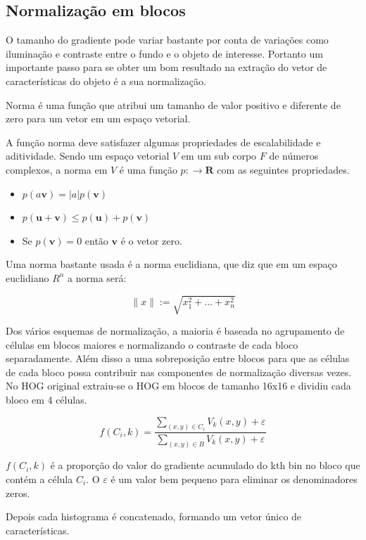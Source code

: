 \subsection{Normalização em blocos}

O tamanho do gradiente pode variar bastante por conta de variações como iluminação e contraste entre o fundo e o objeto de interesse. Portanto um importante passo para se obter um bom resultado na extração do vetor de características do objeto é a sua normalização.

Norma é uma função que atribui um tamanho de valor positivo e diferente de zero para um vetor em um espaço vetorial.

A função norma deve satisfazer algumas propriedades de escalabilidade e aditividade.
Sendo um espaço vetorial \(V\) em um sub corpo \(F\) de números complexos, a norma em \(V\) é uma função \(p:\rightarrow \mathbf{R}\) com as seguintes propriedades.

\begin{itemize}
\item \( p(a\mathbf{v}) = |a|p(\mathbf{v}) \)
\item \( p(\mathbf{u + v}) \leq p(\mathbf{u}) + p(\mathbf{v}) \)
\item Se \( p(\mathbf{v}) = 0 \) então \(\mathbf{v}\) é o vetor zero.
\end{itemize}

Uma norma bastante usada é a norma euclidiana,  que diz que em um espaço euclidiano \(R^n\) a norma será:

\[\|x\| := \sqrt{x_1^2 + ... + x_n^2}\]

Dos vários esquemas de normalização, a maioria é baseada no agrupamento de células em blocos maiores e normalizando o contraste de cada bloco separadamente. Além disso a uma sobreposição entre blocos para que as células de cada bloco possa contribuir nas componentes de normalização diversas vezes.
No HOG original extraiu-se o HOG em blocos de tamanho 16x16 e dividiu cada bloco em 4 células. 

\[
f(C_{i},k) = \frac
{\sum_{(x,y) \in C_i}V_k(x,y) + \varepsilon}
{\sum_{(x,y) \in B}V_k(x,y) + \varepsilon}
\]

\(f(C_i,k)\) é a proporção do valor do gradiente acumulado do kth bin no bloco que contém a célula \(C_i\). O \(\varepsilon\) é um valor bem pequeno para eliminar os denominadores zeros.

Depois cada histograma é concatenado, formando um vetor único de características.


